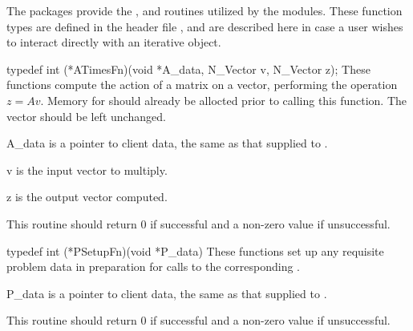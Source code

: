 The {\sundials} packages provide the , 
and  routines utilized by the {\sunlinsol} modules.  These
function types are defined in the header
file , and are described here in
case a user wishes to interact directly with an iterative {\sunlinsol}
object. 



{
  typedef int (*ATimesFn)(void *A\_data, N\_Vector v, N\_Vector z);
}
{
  These functions compute the action of a matrix on a vector,
  performing the operation $z = Av$.  Memory for  should already be
  allocted prior to calling this function.  The vector  should
  be left unchanged.  
}
{
  \begin{args}
  \item[A\_data]
    is a pointer to client data, the same as that supplied to .
  \item[v]
    is the input vector to multiply.
  \item[z]
    is the output vector computed.
  \end{args}
}
{  
  This routine should return 0 if successful and a         
  non-zero value if unsuccessful.
}
{
}



{
  typedef int (*PSetupFn)(void *P\_data)
}
{
  These functions set up any requisite problem data in preparation
  for calls to the corresponding . 
}
{
  \begin{args}
  \item[P\_data]
    is a pointer to client data, the same as that supplied to .
  \end{args}
}
{  
  This routine should return 0 if successful and a non-zero value if unsuccessful. 
}
{
}


